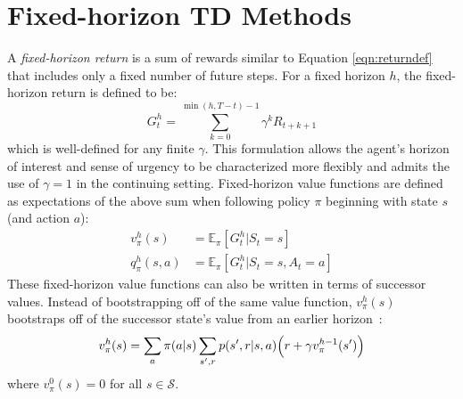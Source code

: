 \documentclass[letterpaper]{article} %
\begin{document}
\section{Fixed-horizon TD Methods}\label{sec:fhreturns}



A \textit{fixed-horizon return} is a sum of rewards similar to Equation \ref{eqn:returndef} that includes only a fixed number of future steps. %
For a fixed horizon $h$, the fixed-horizon return is defined to be:
\begin{equation}
G^h_t = \sum_{k=0}^{\min(h, T-t) - 1} \gamma^k R_{t+k+1}
\label{eqn:deffhreturn}
\end{equation}
which is well-defined for any finite $\gamma$. %
This formulation allows the agent's horizon of interest and sense of urgency to be characterized more flexibly and admits the use of $\gamma = 1$ in the continuing setting.
Fixed-horizon value functions are defined as expectations of the above sum when %
following policy $\pi$ beginning with state $s$ (and action $a$):
\begin{align}
v^h_\pi(s) &= \mathbb{E}_\pi[G^h_t|S_t=s]
\label{eqn:deffhstatevalues} \\
q^h_\pi(s, a) &= \mathbb{E}_\pi[G^h_t|S_t=s, A_t=a]
\label{eqn:deffhactionvalues}
\end{align}
These fixed-horizon value functions can also be written in terms of successor values. Instead of bootstrapping off of the same value function, $v^h_\pi(s)$ bootstraps off of the successor state's value from an earlier horizon~\cite{bertsekastwo2012}:
\begin{equation}\small
v^h_\pi(s) = \sum_{a}{\pi(a|s)\sum_{s', r}{p(s',r|s,a)\Big(r + \gamma v^{h-1}_\pi(s')\Big)}}
\label{eqn:fhvbellman}
\end{equation}
where $v^{0}_{\pi}(s) = 0$ for all $s \in \mathcal{S}$.%
\end{document}
